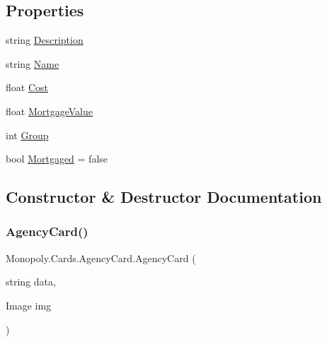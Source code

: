 \subsection*{Properties}
\begin{DoxyCompactItemize}
\item 
string \mbox{\hyperlink{class_monopoly_1_1_cards_1_1_agency_card_a5138a452ca504b2073eb739eca1e9abe}{Description}}
\item 
string \mbox{\hyperlink{class_monopoly_1_1_cards_1_1_card_ac114f0ec54d1b86154e9c596c3980003}{Name}}
\item 
float \mbox{\hyperlink{class_monopoly_1_1_cards_1_1_card_a67df91aa53596b2ce61ef2c3386ddd7c}{Cost}}
\item 
float \mbox{\hyperlink{class_monopoly_1_1_cards_1_1_card_adb2af81dda38706437f368b088c9b1a6}{Mortgage\+Value}}
\item 
int \mbox{\hyperlink{class_monopoly_1_1_cards_1_1_card_a90d55a4790f3d8afeba0203b70fa2086}{Group}}
\item 
bool \mbox{\hyperlink{class_monopoly_1_1_cards_1_1_card_a5569d582a0692b3a37c81dd2320cc367}{Mortgaged}} = false
\end{DoxyCompactItemize}


\subsection{Constructor \& Destructor Documentation}
\mbox{\label{class_monopoly_1_1_cards_1_1_agency_card_ac328333ee5f6dc5b7e0903af22aff615}} 
\subsubsection{\texorpdfstring{Agency\+Card()}{AgencyCard()}}
{\footnotesize\ttfamily Monopoly.\+Cards.\+Agency\+Card.\+Agency\+Card (\begin{DoxyParamCaption}\item[{string}]{data,  }\item[{Image}]{img }\end{DoxyParamCaption})\hspace{0.3cm}{\ttfamily [inline]}}

